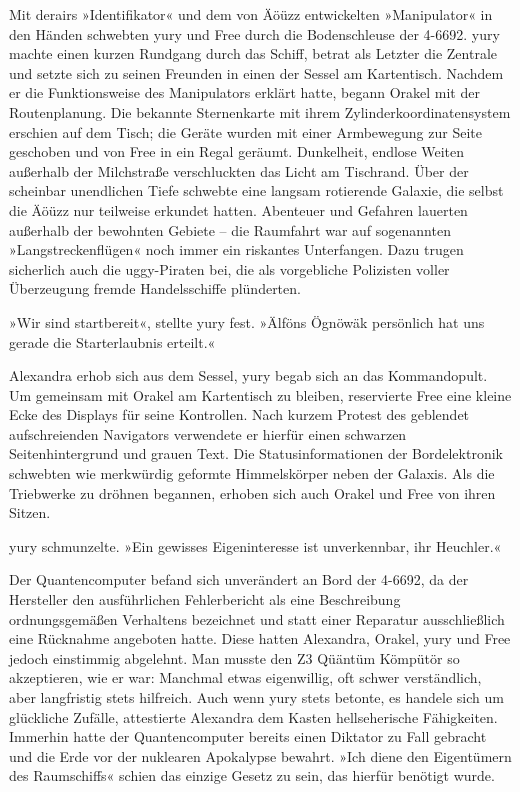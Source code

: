 Mit derairs »Identifikator« und dem von Äöüzz entwickelten »Manipulator« in den Händen schwebten yury und Free durch die Bodenschleuse der 4-6692. yury machte einen kurzen Rundgang durch das Schiff, betrat als Letzter die Zentrale und setzte sich zu seinen Freunden in einen der Sessel am Kartentisch. Nachdem er die Funktionsweise des Manipulators erklärt hatte, begann Orakel mit der Routenplanung. Die bekannte Sternenkarte mit ihrem Zylinderkoordinatensystem erschien auf dem Tisch; die Geräte wurden mit einer Armbewegung zur Seite geschoben und von Free in ein Regal geräumt. Dunkelheit, endlose Weiten außerhalb der Milchstraße verschluckten das Licht am Tischrand. Über der scheinbar unendlichen Tiefe schwebte eine langsam rotierende Galaxie, die selbst die Äöüzz nur teilweise erkundet hatten. Abenteuer und Gefahren lauerten außerhalb der bewohnten Gebiete – die Raumfahrt war auf sogenannten »Langstreckenflügen« noch immer ein riskantes Unterfangen. Dazu trugen sicherlich auch die uggy-Piraten bei, die als vorgebliche Polizisten voller Überzeugung fremde Handelsschiffe plünderten.

»Wir sind startbereit«, stellte yury fest. »Älföns Ögnöwäk persönlich hat uns gerade die Starterlaubnis erteilt.«

Alexandra erhob sich aus dem Sessel, yury begab sich an das Kommandopult. Um gemeinsam mit Orakel am Kartentisch zu bleiben, reservierte Free eine kleine Ecke des Displays für seine Kontrollen. Nach kurzem Protest des geblendet aufschreienden Navigators verwendete er hierfür einen schwarzen Seitenhintergrund und grauen Text. Die Statusinformationen der Bordelektronik schwebten wie merkwürdig geformte Himmelskörper neben der Galaxis. Als die Triebwerke zu dröhnen begannen, erhoben sich auch Orakel und Free von ihren Sitzen.


yury schmunzelte. »Ein gewisses Eigeninteresse ist unverkennbar, ihr Heuchler.«


Der Quantencomputer befand sich unverändert an Bord der 4-6692, da der Hersteller den ausführlichen Fehlerbericht als eine Beschreibung ordnungsgemäßen Verhaltens bezeichnet und statt einer Reparatur ausschließlich eine Rücknahme angeboten hatte. Diese hatten Alexandra, Orakel, yury und Free jedoch einstimmig abgelehnt. Man musste den Z3 Qüäntüm Kömpütör so akzeptieren, wie er war: Manchmal etwas eigenwillig, oft schwer verständlich, aber langfristig stets hilfreich. Auch wenn yury stets betonte, es handele sich um glückliche Zufälle, attestierte Alexandra dem Kasten hellseherische Fähigkeiten. Immerhin hatte der Quantencomputer bereits einen Diktator zu Fall gebracht und die Erde vor der nuklearen Apokalypse bewahrt. »Ich diene den Eigentümern des Raumschiffs« schien das einzige Gesetz zu sein, das hierfür benötigt wurde.

